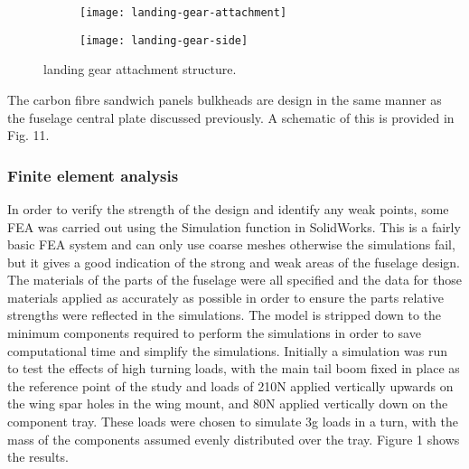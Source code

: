 \documentclass[../../main.tex]{subfiles}
\begin{document}
\begin{figure}[H]

    \centering
    \begin{subfigure}[b]{0.4\columnwidth}
        \centering
        \texttt{[image: landing-gear-attachment]}
        \caption{}
        \label{fig:landing-gear-attachment:angled}
    \end{subfigure}
    \hfill
    \begin{subfigure}[b]{0.49\columnwidth}
        \centering
        \texttt{[image: landing-gear-side]}
        \caption{}
        \label{fig:landing-gear-attachment:side}
    \end{subfigure}
    
    \caption{landing gear attachment structure.}
    \label{fig:landing-gear-attachment}
\end{figure}

The carbon fibre sandwich panels bulkheads are design in the same manner as the fuselage central plate discussed previously.
A schematic of this is provided in Fig. 11. 


\subsubsection{Finite element analysis} \label{sec:design-process:final-design-proposal:fuselage:finite-element-analysis}

In order to verify the strength of the design and identify any weak points, some FEA was carried out using the Simulation function in SolidWorks.
This is a fairly basic FEA system and can only use coarse meshes otherwise the simulations fail, but it gives a good indication of the strong and weak areas of the fuselage design.
The materials of the parts of the fuselage were all specified and the data for those materials applied as accurately as possible in order to ensure the parts relative strengths were reflected in the simulations.
The model is stripped down to the minimum components required to perform the simulations in order to save computational time and simplify the simulations.
Initially a simulation was run to test the effects of high turning loads, with the main tail boom fixed in place as the reference point of the study and loads of 210N applied vertically upwards on the wing spar holes in the wing mount, and 80N applied vertically down on the component tray.
These loads were chosen to simulate 3g loads in a turn, with the mass of the components assumed evenly distributed over the tray.
Figure 1 shows the results.
\end{document}
